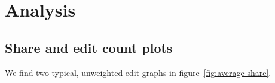 \section*{Analysis}
\subsection*{Share and edit count plots}
We find two typical, unweighted edit graphs in
figure~\ref{fig:average-share}.

